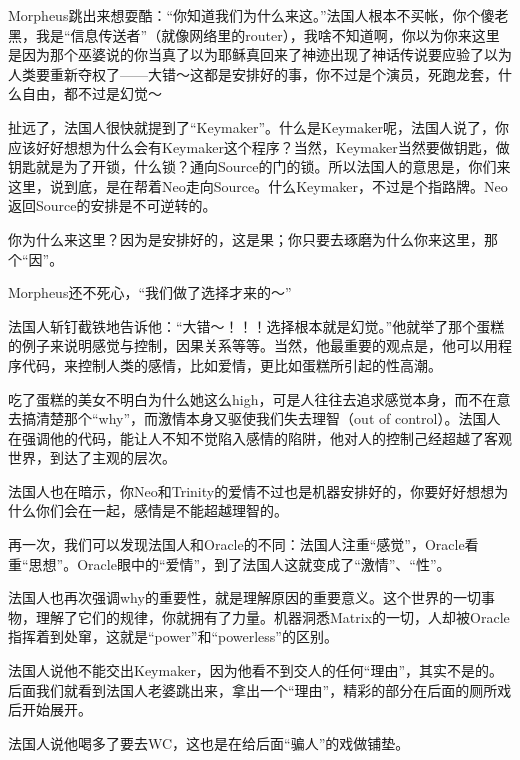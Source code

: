 \documentclass[UTF8]{ctexart}
\begin{document}
Morpheus跳出来想耍酷：“你知道我们为什么来这。”法国人根本不买帐，你个傻老黑，我是“信息传送者”（就像网络里的router），我啥不知道啊，你以为你来这里是因为那个巫婆说的你当真了以为耶稣真回来了神迹出现了神话传说要应验了以为人类要重新夺权了——大错～这都是安排好的事，你不过是个演员，死跑龙套，什么自由，都不过是幻觉～

扯远了，法国人很快就提到了“Keymaker”。什么是Keymaker呢，法国人说了，你应该好好想想为什么会有Keymaker这个程序？当然，Keymaker当然要做钥匙，做钥匙就是为了开锁，什么锁？通向Source的门的锁。所以法国人的意思是，你们来这里，说到底，是在帮着Neo走向Source。什么Keymaker，不过是个指路牌。Neo返回Source的安排是不可逆转的。

你为什么来这里？因为是安排好的，这是果；你只要去琢磨为什么你来这里，那个“因”。

Morpheus还不死心，“我们做了选择才来的～”

法国人斩钉截铁地告诉他：“大错～！！！选择根本就是幻觉。”他就举了那个蛋糕的例子来说明感觉与控制，因果关系等等。当然，他最重要的观点是，他可以用程序代码，来控制人类的感情，比如爱情，更比如蛋糕所引起的性高潮。

吃了蛋糕的美女不明白为什么她这么high，可是人往往去追求感觉本身，而不在意去搞清楚那个“why”，而激情本身又驱使我们失去理智（out of control）。法国人在强调他的代码，能让人不知不觉陷入感情的陷阱，他对人的控制己经超越了客观世界，到达了主观的层次。

法国人也在暗示，你Neo和Trinity的爱情不过也是机器安排好的，你要好好想想为什么你们会在一起，感情是不能超越理智的。

再一次，我们可以发现法国人和Oracle的不同：法国人注重“感觉”，Oracle看重“思想”。Oracle眼中的“爱情”，到了法国人这就变成了“激情”、“性”。

法国人也再次强调why的重要性，就是理解原因的重要意义。这个世界的一切事物，理解了它们的规律，你就拥有了力量。机器洞悉Matrix的一切，人却被Oracle指挥着到处窜，这就是“power”和“powerless”的区别。

法国人说他不能交出Keymaker，因为他看不到交人的任何“理由”，其实不是的。后面我们就看到法国人老婆跳出来，拿出一个“理由”，精彩的部分在后面的厕所戏后开始展开。

法国人说他喝多了要去WC，这也是在给后面“骗人”的戏做铺垫。
\end{document}

